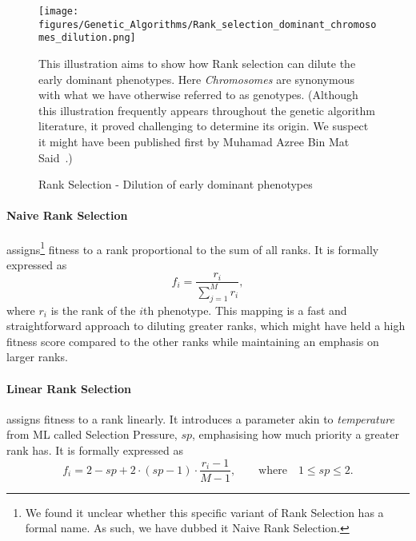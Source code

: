 \begin{figure}[H]
    \centering
    \texttt{[image: figures/Genetic\_Algorithms/Rank\_selection\_dominant\_chromosomes\_dilution.png]}
    \caption{Rank Selection - Dilution of early dominant phenotypes}
    \small
    \raggedright
    This illustration aims to show how Rank selection can dilute the early dominant phenotypes. Here \textit{Chromosomes} are synonymous with what we have otherwise referred to as genotypes. (Although this illustration frequently appears throughout the genetic algorithm literature, it proved challenging to determine its origin. We suspect it might have been published first by Muhamad Azree Bin Mat Said~\cite{Rank-Selection-Illustration-Origin}.) 
    \label{fig:GA_Rank_Selection}
\end{figure}

\paragraph{Naive Rank Selection} assigns\footnote{We found it unclear whether this specific variant of Rank Selection has a formal name. As such, we have dubbed it Naive Rank Selection.} fitness to a rank proportional to the sum of all ranks. It is formally expressed as
\begin{equation*}
    f_i = \frac{r_i}{\sum_{j = 1}^M r_i},
\end{equation*}
where $r_i$ is the rank of the $i$th phenotype. This mapping is a fast and straightforward approach to diluting greater ranks, which might have held a high fitness score compared to the other ranks while maintaining an emphasis on larger ranks.

\paragraph{Linear Rank Selection} assigns fitness to a rank linearly. It introduces a parameter akin to \emph{temperature} from ML called Selection Pressure, $sp$, emphasising how much priority a greater rank has. It is formally expressed as 
\begin{equation*}
    f_i = 2 - sp + 2 \cdot (sp - 1) \cdot \frac{r_i - 1}{M - 1}, \qquad \text{where} \quad 1 \leq sp \leq 2.
\end{equation*}

